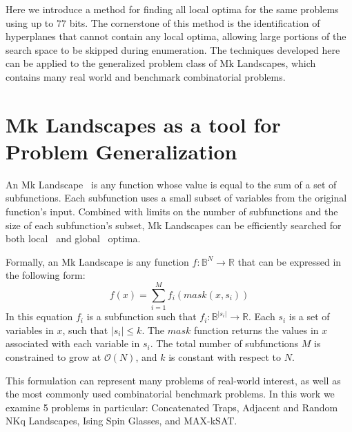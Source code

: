 \documentclass[runningheads,a4paper]{llncs}
\newcommand{\BigO}[1]{$\mathcal{O}{(#1)}$}
\begin{document}
Here we introduce a method for finding all local optima for the same problems using
up to 77 bits. The cornerstone of this method is the identification
of hyperplanes that cannot contain any local optima, allowing large
portions of the search space to be skipped during enumeration.
The techniques developed here can be applied to the generalized problem class of Mk Landscapes,
which contains many real world and benchmark combinatorial problems.



\section{Mk Landscapes as a tool for Problem Generalization}
\label{sec-mk}
An Mk Landscape~\cite{whitley:2015:mk} is any function
whose value is equal to the sum of a set of subfunctions.
Each subfunction uses a small subset of variables from the original function's input.
Combined with limits on the number of subfunctions and the size of each subfunction's
subset, Mk Landscapes can be efficiently searched for both local~\cite{whitley:2012:constant,chicano:2014:ball}
and global~\cite{goldman:2015:GBO,tintos:2015:partitioncross} optima.

Formally, an Mk Landscape is any function $f : \mathbb{B}^{N}\rightarrow \mathbb{R}$
that can be expressed in the following form:
\begin{equation}
  f(x) = \sum_{i=1}^{M} f_i(mask(x, s_i))
  \label{eq-mk}
\end{equation}
In this equation $f_i$ is a subfunction such that $f_i : \mathbb{B}^{|s_i|}\rightarrow \mathbb{R}$.
Each $s_i$ is a set of variables in $x$, such that $|s_i| \leq k$.
The $mask$ function
returns the values in $x$ associated with each variable in $s_i$.
The total number of subfunctions $M$ is constrained to grow at \BigO{N}, and $k$
is constant with respect to $N$.

This formulation can represent many problems of real-world interest, as well as
the most commonly used combinatorial benchmark problems. In this work we
examine 5 problems in particular: Concatenated Traps, Adjacent and Random NKq Landscapes,
Ising Spin Glasses, and MAX-kSAT.
\end{document}
